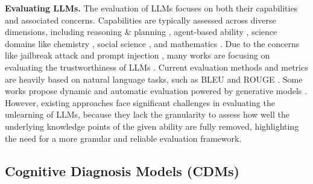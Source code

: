 \textbf{Evaluating LLMs.} The evaluation of  LLMs focuses on both their capabilities and associated concerns. Capabilities are typically assessed across diverse dimensions, including reasoning \& planning \citep{bang2023multitask,huang2024understanding,valmeekam2024planbench,guo2025can}, agent-based ability \citep{liu2023agentbench, huangmetatool}, science domains like chemistry \citep{huang2024chemeval,guo2023can}, social science \citep{huang2024social, li2024quantifying}, and mathematics \citep{liu2024mathbench,liang2024scemqa}. Due to the concerns like jailbreak attack \citep{huang2024obscureprompt, zhou2024defending} and prompt injection \citep{10.1145/3658644.3690291}, many works are focusing on evaluating the trustworthiness of LLMs \citep{huang2024trustllm, zhang2023safetybench, zhou2024attack, zhou2024labsafety, huang2023trustgpt, gao2024honestllm}. Current evaluation methods and metrics are heavily based on natural language tasks, such as BLEU \citep{papineni2002bleu} and ROUGE \citep{lin2004rouge}. Some works propose dynamic and automatic evaluation powered by generative models \citep{zhu2024dynamic, wu2024unigen, bao2024autobench, huang2025position}. However, existing approaches face significant challenges in evaluating the unlearning of LLMs, because they lack the granularity to assess how well the underlying knowledge points of the given ability are fully removed, highlighting the need for a more granular and reliable evaluation framework.



\vspace{-0.05in}
\subsection{Cognitive Diagnosis Models (CDMs)}

